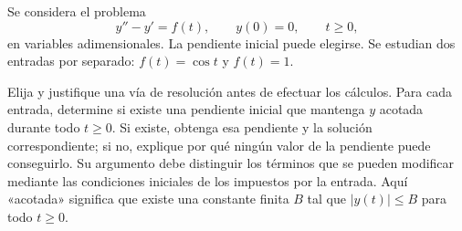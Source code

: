 Se considera el problema
\[
y''-y'=f(t),\qquad y(0)=0,\qquad t\ge0,
\]
en variables adimensionales. La pendiente inicial puede elegirse. Se estudian dos entradas por separado: \(f(t)=\cos t\) y \(f(t)=1\).

Elija y justifique una vía de resolución antes de efectuar los cálculos. Para cada entrada, determine si existe una pendiente inicial que mantenga \(y\) acotada durante todo \(t\ge0\). Si existe, obtenga esa pendiente y la solución correspondiente; si no, explique por qué ningún valor de la pendiente puede conseguirlo. Su argumento debe distinguir los términos que se pueden modificar mediante las condiciones iniciales de los impuestos por la entrada. Aquí «acotada» significa que existe una constante finita \(B\) tal que \(|y(t)|\le B\) para todo \(t\ge0\).
